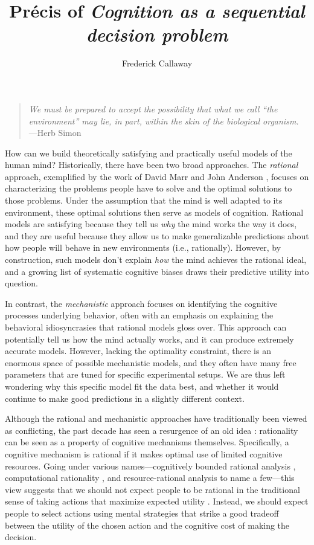 \documentclass[12pt,a4paperpaper,]{article}
\title{Pr\'ecis of \emph{Cognition as a sequential decision problem}}
\author{Frederick Callaway}
\begin{document}
\maketitle

\begin{quote}
\emph{We must be prepared to accept the possibility that what we call
``the environment'' may lie, in part, within the skin of the biological
organism.} ---Herb Simon \citeyearpar{simon1955behavioral}
\end{quote}

How can we build theoretically satisfying and practically useful models of the human mind? Historically, there have been two broad approaches. The \emph{rational} approach, exemplified by the work of David Marr \citeyearpar{marr1982vision} and John Anderson \citeyearpar{anderson1990adaptive}, focuses on characterizing the problems people have to solve and the optimal solutions to those problems. Under the assumption that the mind is well adapted to its environment, these optimal solutions then serve as models of cognition. Rational models are satisfying because they tell us \emph{why} the mind works the way it does, and they are useful because they allow us to make generalizable predictions about how people will behave in new environments (i.e., rationally). However, by construction, such models don't explain \emph{how} the mind achieves the rational ideal, and a growing list of systematic cognitive biases \citep{kahneman2011thinking} draws their predictive utility into question.

In contrast, the \emph{mechanistic} approach focuses on identifying the cognitive processes underlying behavior, often with an emphasis on explaining the behavioral idiosyncrasies that rational models gloss over. This approach can potentially tell us how the mind actually works, and it can produce extremely accurate models. However, lacking the optimality constraint, there is an enormous space of possible mechanistic models, and they often have many free parameters that are tuned for specific experimental setups. We are thus left wondering why this specific model fit the data best, and whether it would continue to make good predictions in a slightly different context.

Although the rational and mechanistic approaches have traditionally been viewed as conflicting, the past decade has seen a resurgence of an old idea \citep{simon1955behavioral}: rationality can be seen as a property of cognitive mechanisms themselves. Specifically, a cognitive mechanism is rational if it makes optimal use of limited cognitive resources. Going under various names---cognitively bounded rational analysis \citep{howes2009rational}, computational rationality \citep{lewis2014computational,gershman2015computational}, and resource-rational analysis \citep{griffiths2015rational,lieder2020resourcerational} to name a few---this view suggests that we should not expect people to be rational in the traditional sense of taking actions that maximize expected utility \citep{vonneumann1944theory}. Instead, we should expect people to select actions using mental strategies that strike a good tradeoff between the utility of the chosen action and the cognitive cost of making the decision.
\end{document}
